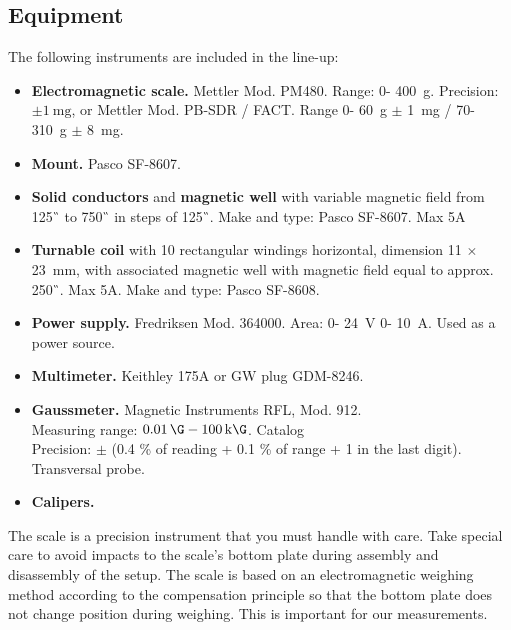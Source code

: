 \documentclass[../Elmag-labhefte-2020.tex]{subfiles}
\begin{document}
\subsection{Equipment}

The following instruments are included in the line-up:
\vspace{-4mm}
\begin{itemize}
    \item \textbf{Electromagnetic scale.} Mettler Mod. PM480. Range: 0- \SI{400}{\g}. Precision: $\pm \SI{1}{\milli\g}$, or Mettler Mod. PB-SDR / FACT. Range 0- \SI{60}{\g} $\pm$ \SI{1}{\milli\g} / 70- \SI{310}{\g} $\pm$ \SI{8}{\milli\g}.
    \item \textbf{Mount.} Pasco SF-8607.
    \item \textbf{Solid conductors} and \textbf{magnetic well} with variable magnetic field from \SI{125}{\G} to \SI{750}{\G} in steps of \SI{125}{\G}. Make and type: Pasco SF-8607. Max 5A
    \item \textbf{Turnable coil} with 10 rectangular windings horizontal, dimension 11 $\times$ \SI{23}{\mm}, with associated magnetic well with magnetic field equal to approx. \SI{250}{\G}. Max 5A.
    Make and type: Pasco SF-8608.
    \item \textbf{Power supply.} Fredriksen Mod. 364000. Area: 0- \SI{24}{\volt} 0- \SI{10}{\ampere}. Used as a power source.
    \item \textbf{Multimeter.} Keithley 175A or GW plug GDM-8246.
    \item \textbf{Gaussmeter.} Magnetic Instruments RFL, Mod. 912. \\
    Measuring range: \(\SI{0.01}{\G} - \SI{100}{\kilo\G} \). Catalog \\
    Precision: \(\pm \) (0.4 \% of reading + 0.1 \% of range + 1 in the last digit).\\
    Transversal probe.
    \item \textbf{Calipers.}
\end{itemize}

The scale is a precision instrument that you must handle with care.
Take special care to avoid impacts to the scale's bottom plate during assembly and disassembly of the setup. The scale is based on an electromagnetic weighing method according to the compensation principle so that the bottom plate does not change position during weighing. This is important for our measurements.
\end{document}
